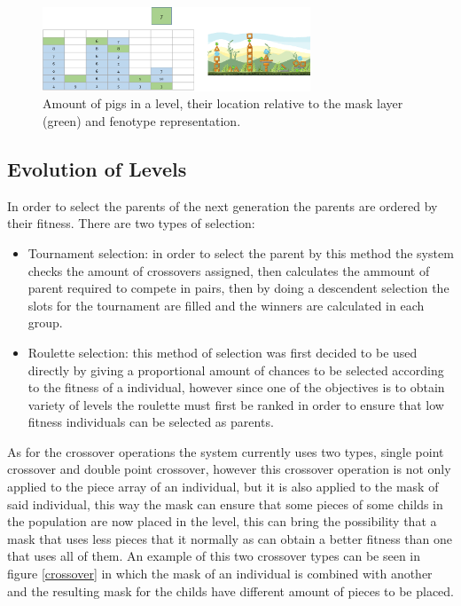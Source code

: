 \documentclass[conference]{IEEEtran}
\begin{document}
    \begin{figure}[htbp]
        \centerline{\includegraphics[width=80mm]{Images/enemy_layer.png}}
        \caption{Amount of pigs in a level, their location relative to the mask layer
         (green) and fenotype representation.}
        \label{enemy_layer}
    \end{figure}
    
    \subsection{Evolution of Levels} 

    In order to select the parents of the next generation the parents are ordered by
    their fitness. There are two types of selection:
    
    \begin{itemize}
        \item Tournament selection: in order to select the parent by this method the
        system checks the amount of crossovers assigned, then calculates the ammount
        of parent required to compete in pairs, then by doing a descendent selection
        the slots for the tournament are filled and the winners are calculated in
        each group.
        \item Roulette selection: this method of selection was first decided to be
        used directly by giving a proportional amount of chances to be selected
        according to the fitness of a individual, however since one of the
        objectives is to obtain variety of levels the roulette must first be ranked
        in order to ensure that low fitness individuals can be selected as parents.
    \end{itemize}
    
    As for the crossover operations the system currently uses two types, single
    point crossover and double point crossover, however this crossover operation is
    not only applied to the piece array of an individual, but it is also applied to
    the mask of said individual, this way the mask can ensure that some pieces of
    some childs in the population are now placed in the level, this can bring the
    possibility that a mask that uses less pieces that it normally as can obtain a
    better fitness than one that uses all of them. An example of this two crossover
    types can be seen in figure \ref{crossover} in which the mask of an individual
    is combined with another and the resulting mask for the childs have different
    amount of pieces to be placed.
    
\end{document}
